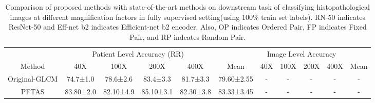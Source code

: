 \documentclass[conference]{IEEEtran}
\begin{document}
\begin{table*}[ht]
\caption{Comparison of proposed methods with state-of-the-art methods on downstream task of classifying histopathological images at different magnification factors in fully supervised setting(using 100\% train set labels). RN-50 indicates ResNet-50 and Eff-net b2 indicates Efficient-net b2 encoder. Also, OP indicates Ordered Pair, FP indicates Fixed Pair, and RP indcates Random Pair.}
\label{ft_80_sota}
\begin{adjustbox}{max width=\textwidth}
\begin{tabular}{c|cccc|c|cccc|c}

\hline
                                                            & \multicolumn{4}{c|}{Patient Level Accuracy (RR)}                                                                                                                                                                           &                        & \multicolumn{4}{c|}{Image Level Accuracy}                                                                                                            &                                                       \\ \cline{2-5} \cline{7-10}
\multirow{-2}{*}{Method}                                    & \multicolumn{1}{c|}{40X}                 & \multicolumn{1}{c|}{100X}                                        & \multicolumn{1}{c|}{200X}                                       & 400X                                       & \multirow{-2}{*}{Mean} & \multicolumn{1}{c|}{40X}                 & \multicolumn{1}{c|}{100X}                & \multicolumn{1}{c|}{200X}                & 400X                & \multirow{-2}{*}{Mean}                                \\
\hline
Original-GLCM\cite{spanhol2016breast}   & \multicolumn{1}{c|}{74.7±1.0}            & \multicolumn{1}{c|}{78.6±2.6}                                    & \multicolumn{1}{c|}{83.4±3.3}                                   & 81.7±3.3                                   & 79.60±2.55             & \multicolumn{1}{c|}{-}                   & \multicolumn{1}{c|}{-}                   & \multicolumn{1}{c|}{-}                   & -                   & -                                                     \\
PFTAS\cite{hamilton2007fast}               & \multicolumn{1}{c|}{83.80±2.0}           & \multicolumn{1}{c|}{82.10±4.9}                                   & \multicolumn{1}{c|}{85.10±3.1}                                  & 82.30±3.8                                  & 83.33±3.45             & \multicolumn{1}{c|}{-}                   & \multicolumn{1}{c|}{-}                   & \multicolumn{1}{c|}{-}                   & -                   & -                                                     \\

\end{tabular}
\end{adjustbox}
\end{table*}
\end{document}
